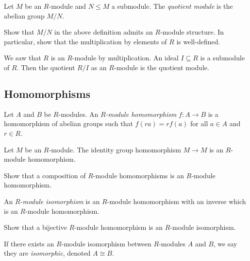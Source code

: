 \documentclass[a4paper,11pt]{article}
\begin{document}
    \begin{definition}
      Let \(M\) be an \(R\)-module and \(N \le M\) a submodule. The \emph{quotient module} is the abelian group \(M/N\).
    \end{definition}

    \begin{exercise}
      Show that \(M/N\) in the above definition admits an \(R\)-module structure. In particular, show that the multiplication by elements of \(R\) is well-defined.
    \end{exercise}

    \begin{example}
      We saw that \(R\) is an \(R\)-module by multiplication. An ideal \(I \subseteq R\) is a submodule of \(R\). Then the quotient \(R/I\) as an \(R\)-module is the quotient module.
    \end{example}

    \subsection{Homomorphisms}
    \begin{definition}
      Let \(A\) and \(B\) be \(R\)-modules. An \emph{\(R\)-module homomorphism} \(f: A \to B\) is a homomorphism of abelian groups such that \(f(ra) = rf(a)\) for all \(a \in A\) and \(r \in R\).
    \end{definition}

    \begin{example}
      Let \(M\) be an \(R\)-module. The identity group homomorphism \(M \to M\) is an \(R\)-module homomorphism.
    \end{example}

    \begin{exercise}
      Show that a composition of \(R\)-module homomorphisms is an \(R\)-module homomorphism.
    \end{exercise}

    \begin{definition}
      An \emph{\(R\)-module isomorphism} is an \(R\)-module homomorphism with an inverse which is an \(R\)-module homomorphism.
    \end{definition}

    \begin{exercise}
      Show that a bijective \(R\)-module homomorphism is an \(R\)-module isomorphism.
    \end{exercise}

    If there exists an \(R\)-module isomorphism between \(R\)-modules \(A\) and \(B\), we say they are \emph{isomorphic}, denoted \(A \cong B\).
\end{document}
